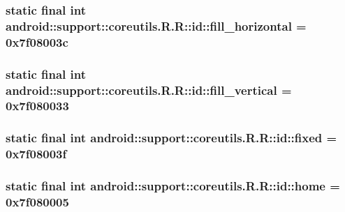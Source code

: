 \hypertarget{classandroid_1_1support_1_1coreutils_1_1_r_1_1id_6e711ca468c4bb036b542379456cb113}{
\subsubsection[{fill\_\-horizontal}]{\setlength{\rightskip}{0pt plus 5cm}static final int android::support::coreutils.R.R::id::fill\_\-horizontal = 0x7f08003c}}
\label{classandroid_1_1support_1_1coreutils_1_1_r_1_1id_6e711ca468c4bb036b542379456cb113}


\hypertarget{classandroid_1_1support_1_1coreutils_1_1_r_1_1id_6f58bf3292192f8ea005ed62cb2bb4a2}{
\subsubsection[{fill\_\-vertical}]{\setlength{\rightskip}{0pt plus 5cm}static final int android::support::coreutils.R.R::id::fill\_\-vertical = 0x7f080033}}
\label{classandroid_1_1support_1_1coreutils_1_1_r_1_1id_6f58bf3292192f8ea005ed62cb2bb4a2}


\hypertarget{classandroid_1_1support_1_1coreutils_1_1_r_1_1id_947dde3055e0b3189cec4214e9de970b}{
\subsubsection[{fixed}]{\setlength{\rightskip}{0pt plus 5cm}static final int android::support::coreutils.R.R::id::fixed = 0x7f08003f}}
\label{classandroid_1_1support_1_1coreutils_1_1_r_1_1id_947dde3055e0b3189cec4214e9de970b}


\hypertarget{classandroid_1_1support_1_1coreutils_1_1_r_1_1id_5028a76613755fa394d111962bb23639}{
\subsubsection[{home}]{\setlength{\rightskip}{0pt plus 5cm}static final int android::support::coreutils.R.R::id::home = 0x7f080005}}
\label{classandroid_1_1support_1_1coreutils_1_1_r_1_1id_5028a76613755fa394d111962bb23639}


